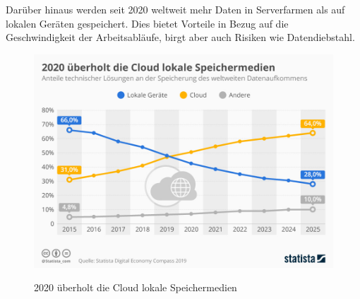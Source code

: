 Darüber hinaus werden seit 2020 weltweit mehr Daten in Serverfarmen als auf lokalen Geräten gespeichert. Dies bietet Vorteile in Bezug auf die Geschwindigkeit der Arbeitsabläufe, birgt aber auch Risiken wie Datendiebstahl.
\begin{figure}[h!]
      \centering
      \includegraphics[scale=0.4]{sources/moreCloudStorageThanLocal}
      \caption[2020 überholt die Cloud lokale Speichermedien]{}\label{fig:moreCloudStorageThanLocal}
      2020 überholt die Cloud lokale Speichermedien
            {\cite{STA1}}
\end{figure}

